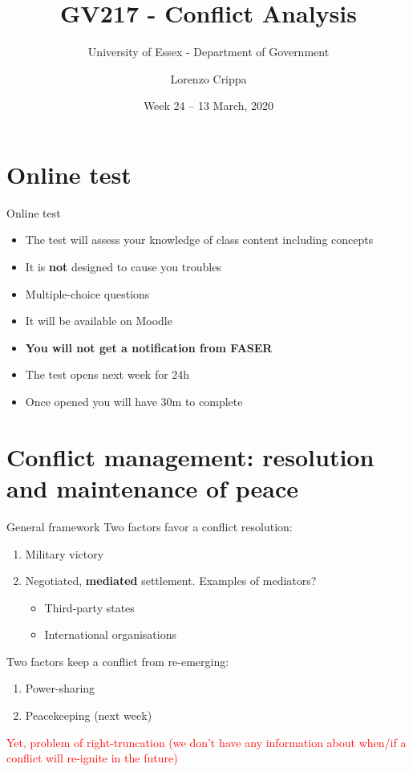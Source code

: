 \documentclass[xcolor=table,usenames,dvipsnames]{beamer}
\title{GV217 - Conflict Analysis}
\subtitle{University of Essex - Department of Government}
\date{Week 24 -- 13 March, 2020}				%
\author{Lorenzo Crippa}
\begin{document}
\frame{
\titlepage
}

\section{Online test}

\begin{frame}{Online test}
\begin{itemize}
\item The test will assess your knowledge of class content including concepts
\item It is \textbf{not} designed to cause you troubles
\item Multiple-choice questions
\item It will be available on Moodle 
\item \textbf{You will not get a notification from FASER}
\item The test opens next week for 24h
\item Once opened you will have 30m to complete
\end{itemize}
\end{frame}

\section{Conflict management: resolution and maintenance of peace}

\begin{frame}{General framework}
Two factors favor a conflict resolution: \pause
\begin{enumerate}
\item Military victory \pause
\item Negotiated, \textbf{mediated} settlement. Examples of mediators? \pause 
	\begin{itemize}
	\item Third-party states \pause 
	\item International organisations
	\end{itemize}
\end{enumerate} \pause

Two factors keep a conflict from re-emerging: \pause
\begin{enumerate}
\item Power-sharing \pause
\item Peacekeeping (next week) \pause
\end{enumerate}

\textcolor{red}{Yet, problem of right-truncation (we don't have any information about when/if a conflict will re-ignite in the future)}
\end{frame}
\end{document}
